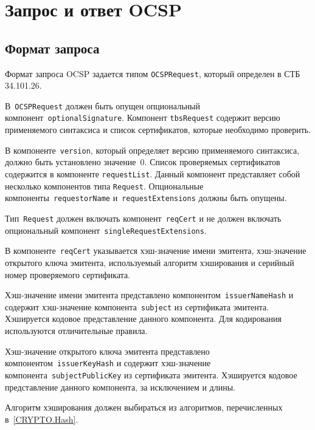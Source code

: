 \section{Запрос и ответ OCSP}\label{FMT.OCSP}

\subsection{Формат запроса}

Формат запроса OCSP задается типом \texttt{OCSPRequest}, который определен 
в СТБ 34.101.26. 

В~\texttt{OCSPRequest} должен быть опущен опциональный 
компонент~\texttt{optionalSignature}. Компонент \texttt{tbsRequest} содержит 
версию применяемого синтаксиса и список сертификатов, которые необходимо 
проверить.

В компоненте~\texttt{version}, который определяет версию применяемого 
синтаксиса, должно быть установлено значение~$0$.
Список проверяемых сертификатов содержится в компоненте
\texttt{requestList}. Данный компонент представляет собой 
несколько компонентов типа \texttt{Request}. Опциональные 
компоненты~\texttt{requestorName} и~\texttt{requestExtensions} должны быть 
опущены. 


Тип~\texttt{Request} должен включать компонент~\texttt{reqCert} и 
не должен включать опциональный компонент~\texttt{singleRequestExtensions}.

В компоненте~\texttt{reqCert} указывается хэш-значение имени эмитента, 
хэш-значение открытого ключа эмитента, используемый алгоритм 
хэширования и серийный номер проверяемого сертификата.

Хэш-значение имени эмитента представлено компонентом~\texttt{issuerNameHash} 
и содержит хэш-значение компонента~\texttt{subject} из сертификата 
эмитента. Хэшируется кодовое представление данного компонента. Для кодирования 
используются отличительные правила.

Хэш-значение открытого ключа эмитента представлено 
компонентом~\texttt{issuerKeyHash} и содержит хэш-значение 
компонента~\texttt{subjectPublicKey} из сертификата эмитента. Хэшируется 
кодовое представление данного компонента, за исключением  и длины.

Алгоритм хэширования должен выбираться из алгоритмов, перечисленных 
в~\ref{CRYPTO.Hash}. 


